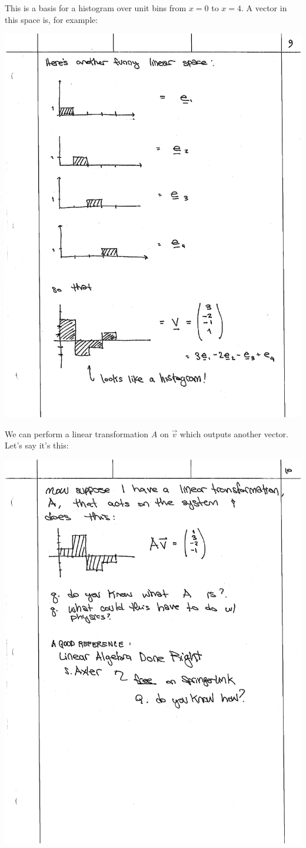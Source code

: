 \noindent This is a basis for a histogram over unit bins from $x=0$ to $x=4$. A vector in this space is, for example:

\begin{center}
\includegraphics[width=.8\textwidth]{figures/lec02_hist.pdf}
\end{center}

\noindent We can perform a linear transformation $A$ on $\vec{v}$ which outputs another vector. Let’s say it’s this:


\begin{center}
\includegraphics[width=.8\textwidth]{figures/lec02_hist2.pdf}
\end{center}

